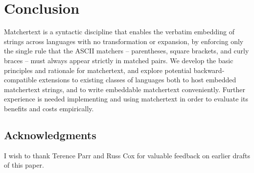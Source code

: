\section{Conclusion}
\label{sec:concl}

Matchertext is a syntactic discipline
that enables the verbatim embedding of strings across languages
with no transformation or expansion,
by enforcing only the single rule that the ASCII matchers --
parentheses, square brackets, and curly braces --
must always appear strictly in matched pairs.
We develop the basic principles and rationale for matchertext,
and explore potential backward-compatible extensions
to existing classes of languages
both to host embedded matchertext strings,
and to write embeddable matchertext conveniently.
Further experience is needed implementing and using matchertext
in order to evaluate its benefits and costs empirically.

\subsection*{Acknowledgments}

I wish to thank Terence Parr and Russ Cox
for valuable feedback on earlier drafts of this paper.


